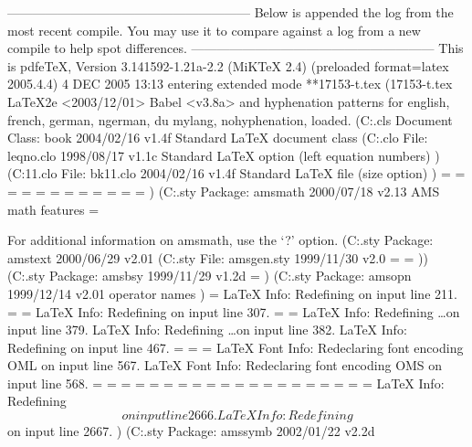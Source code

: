 ---------------------------------------------------------
Below is appended the log from the most recent compile.
You may use it to compare against a log from a new
compile to help spot differences.
---------------------------------------------------------
This is pdfeTeX, Version 3.141592-1.21a-2.2 (MiKTeX 2.4) (preloaded format=latex 2005.4.4)  4 DEC 2005 13:13
entering extended mode
**17153-t.tex
(17153-t.tex
LaTeX2e <2003/12/01>
Babel <v3.8a> and hyphenation patterns for english, french, german, ngerman, du
mylang, nohyphenation, loaded.
(C:\texmf\tex\latex\base\book.cls
Document Class: book 2004/02/16 v1.4f Standard LaTeX document class
(C:\texmf\tex\latex\base\leqno.clo
File: leqno.clo 1998/08/17 v1.1c Standard LaTeX option (left equation numbers)
) (C:\texmf\tex\latex\base\bk11.clo
File: bk11.clo 2004/02/16 v1.4f Standard LaTeX file (size option)
)
\c@part=
\c@chapter=
\c@section=
\c@subsection=
\c@subsubsection=
\c@paragraph=
\c@subparagraph=
\c@figure=
\c@table=
\abovecaptionskip=
\belowcaptionskip=
\bibindent=
)
(C:\texmf\tex\latex\amsmath\amsmath.sty
Package: amsmath 2000/07/18 v2.13 AMS math features
\@mathmargin=

For additional information on amsmath, use the `?' option.
(C:\texmf\tex\latex\amsmath\amstext.sty
Package: amstext 2000/06/29 v2.01
 (C:\texmf\tex\latex\amsmath\amsgen.sty
File: amsgen.sty 1999/11/30 v2.0
\@emptytoks=
\ex@=
)) (C:\texmf\tex\latex\amsmath\amsbsy.sty
Package: amsbsy 1999/11/29 v1.2d
\pmbraise@=
)
(C:\texmf\tex\latex\amsmath\amsopn.sty
Package: amsopn 1999/12/14 v2.01 operator names
)
\inf@bad=
LaTeX Info: Redefining \frac on input line 211.
\uproot@=
\leftroot@=
LaTeX Info: Redefining \overline on input line 307.
\classnum@=
\DOTSCASE@=
LaTeX Info: Redefining \ldots on input line 379.
LaTeX Info: Redefining \dots on input line 382.
LaTeX Info: Redefining \cdots on input line 467.
\Mathstrutbox@=
\strutbox@=
\big@size=
LaTeX Font Info:    Redeclaring font encoding OML on input line 567.
LaTeX Font Info:    Redeclaring font encoding OMS on input line 568.
\macc@depth=
\c@MaxMatrixCols=
\dotsspace@=
\c@parentequation=
\dspbrk@lvl=
\tag@help=
\row@=
\column@=
\maxfields@=
\andhelp@=
\eqnshift@=
\alignsep@=
\tagshift@=
\tagwidth@=
\totwidth@=
\lineht@=
\@envbody=
\multlinegap=
\multlinetaggap=
\mathdisplay@stack=
LaTeX Info: Redefining \[ on input line 2666.
LaTeX Info: Redefining \] on input line 2667.
)
(C:\texmf\tex\latex\amsfonts\amssymb.sty
Package: amssymb 2002/01/22 v2.2d

